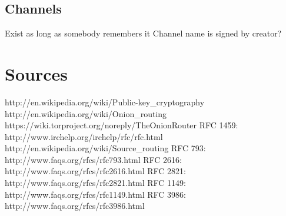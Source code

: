 \documentclass[12pt,a4paper]{book}
\begin{document}
\section{Channels}
Exist as long as somebody remembers it
Channel name is signed by creator?
\appendix
\chapter{Sources}
\begin{thebibliography}{42}
 http://en.wikipedia.org/wiki/Public-key\_cryptography
 http://en.wikipedia.org/wiki/Onion\_routing
 https://wiki.torproject.org/noreply/TheOnionRouter
 RFC 1459: http://www.irchelp.org/irchelp/rfc/rfc.html
 http://en.wikipedia.org/wiki/Source\_routing
 RFC 793: http://www.faqs.org/rfcs/rfc793.html
 RFC 2616: http://www.faqs.org/rfcs/rfc2616.html
 RFC 2821: http://www.faqs.org/rfcs/rfc2821.html
 RFC 1149: http://www.faqs.org/rfcs/rfc1149.html
 RFC 3986: http://www.faqs.org/rfcs/rfc3986.html
\end{thebibliography}
\end{document}
